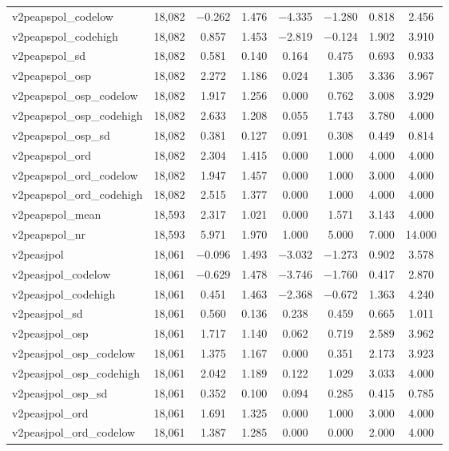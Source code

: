 \begin{table}[!htbp]
\begin{tabular}{@{\extracolsep{5pt}}lccccccc}
v2peapspol\_codelow & 18,082 & $-$0.262 & 1.476 & $-$4.335 & $-$1.280 & 0.818 & 2.456 \\ 
v2peapspol\_codehigh & 18,082 & 0.857 & 1.453 & $-$2.819 & $-$0.124 & 1.902 & 3.910 \\ 
v2peapspol\_sd & 18,082 & 0.581 & 0.140 & 0.164 & 0.475 & 0.693 & 0.933 \\ 
v2peapspol\_osp & 18,082 & 2.272 & 1.186 & 0.024 & 1.305 & 3.336 & 3.967 \\ 
v2peapspol\_osp\_codelow & 18,082 & 1.917 & 1.256 & 0.000 & 0.762 & 3.008 & 3.929 \\ 
v2peapspol\_osp\_codehigh & 18,082 & 2.633 & 1.208 & 0.055 & 1.743 & 3.780 & 4.000 \\ 
v2peapspol\_osp\_sd & 18,082 & 0.381 & 0.127 & 0.091 & 0.308 & 0.449 & 0.814 \\ 
v2peapspol\_ord & 18,082 & 2.304 & 1.415 & 0.000 & 1.000 & 4.000 & 4.000 \\ 
v2peapspol\_ord\_codelow & 18,082 & 1.947 & 1.457 & 0.000 & 1.000 & 3.000 & 4.000 \\ 
v2peapspol\_ord\_codehigh & 18,082 & 2.515 & 1.377 & 0.000 & 1.000 & 4.000 & 4.000 \\ 
v2peapspol\_mean & 18,593 & 2.317 & 1.021 & 0.000 & 1.571 & 3.143 & 4.000 \\ 
v2peapspol\_nr & 18,593 & 5.971 & 1.970 & 1.000 & 5.000 & 7.000 & 14.000 \\ 
v2peasjpol & 18,061 & $-$0.096 & 1.493 & $-$3.032 & $-$1.273 & 0.902 & 3.578 \\ 
v2peasjpol\_codelow & 18,061 & $-$0.629 & 1.478 & $-$3.746 & $-$1.760 & 0.417 & 2.870 \\ 
v2peasjpol\_codehigh & 18,061 & 0.451 & 1.463 & $-$2.368 & $-$0.672 & 1.363 & 4.240 \\ 
v2peasjpol\_sd & 18,061 & 0.560 & 0.136 & 0.238 & 0.459 & 0.665 & 1.011 \\ 
v2peasjpol\_osp & 18,061 & 1.717 & 1.140 & 0.062 & 0.719 & 2.589 & 3.962 \\ 
v2peasjpol\_osp\_codelow & 18,061 & 1.375 & 1.167 & 0.000 & 0.351 & 2.173 & 3.923 \\ 
v2peasjpol\_osp\_codehigh & 18,061 & 2.042 & 1.189 & 0.122 & 1.029 & 3.033 & 4.000 \\ 
v2peasjpol\_osp\_sd & 18,061 & 0.352 & 0.100 & 0.094 & 0.285 & 0.415 & 0.785 \\ 
v2peasjpol\_ord & 18,061 & 1.691 & 1.325 & 0.000 & 1.000 & 3.000 & 4.000 \\ 
v2peasjpol\_ord\_codelow & 18,061 & 1.387 & 1.285 & 0.000 & 0.000 & 2.000 & 4.000 \\ 

\end{tabular}
\end{table}
